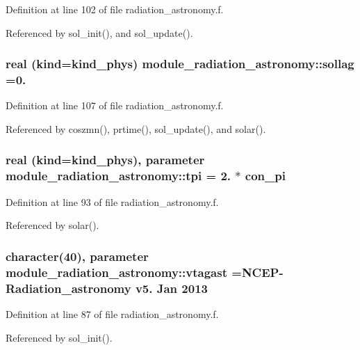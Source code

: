 Definition at line 102 of file radiation\+\_\+astronomy.\+f.



Referenced by sol\+\_\+init(), and sol\+\_\+update().

\subsubsection[{\texorpdfstring{sollag}{sollag}}]{\setlength{\rightskip}{0pt plus 5cm}real (kind=kind\+\_\+phys) module\+\_\+radiation\+\_\+astronomy\+::sollag =0.\hspace{0.3cm}{\ttfamily [private]}}\hypertarget{namespacemodule__radiation__astronomy_a264a011aa71fb670339ac555dc24e486}{}\label{namespacemodule__radiation__astronomy_a264a011aa71fb670339ac555dc24e486}


Definition at line 107 of file radiation\+\_\+astronomy.\+f.



Referenced by coszmn(), prtime(), sol\+\_\+update(), and solar().

\subsubsection[{\texorpdfstring{tpi}{tpi}}]{\setlength{\rightskip}{0pt plus 5cm}real (kind=kind\+\_\+phys), parameter module\+\_\+radiation\+\_\+astronomy\+::tpi = 2. $\ast$ con\+\_\+pi\hspace{0.3cm}{\ttfamily [private]}}\hypertarget{namespacemodule__radiation__astronomy_a4fbf4be04e17f1f8d0674ee2e20506b0}{}\label{namespacemodule__radiation__astronomy_a4fbf4be04e17f1f8d0674ee2e20506b0}


Definition at line 93 of file radiation\+\_\+astronomy.\+f.



Referenced by solar().

\subsubsection[{\texorpdfstring{vtagast}{vtagast}}]{\setlength{\rightskip}{0pt plus 5cm}character(40), parameter module\+\_\+radiation\+\_\+astronomy\+::vtagast =\textquotesingle{}N\+C\+EP-\/Radiation\+\_\+astronomy v5. Jan 2013 \textquotesingle{}\hspace{0.3cm}{\ttfamily [private]}}\hypertarget{namespacemodule__radiation__astronomy_aa3497dc9fa4bbd8248fdf0f2784c268a}{}\label{namespacemodule__radiation__astronomy_aa3497dc9fa4bbd8248fdf0f2784c268a}


Definition at line 87 of file radiation\+\_\+astronomy.\+f.



Referenced by sol\+\_\+init().

